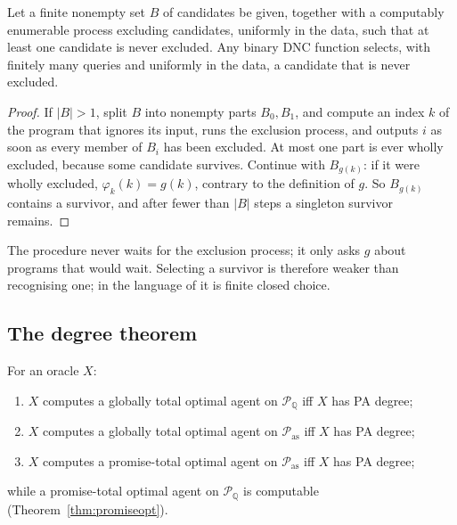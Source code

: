\begin{lemma}\label{lem:finitesel}
Let a finite nonempty set $B$ of candidates be given, together with a computably enumerable process
excluding candidates, uniformly in the data, such that at least one candidate is never excluded. Any
binary DNC function selects, with finitely many queries and uniformly in the data, a candidate that is
never excluded.
\end{lemma}

\begin{proof}
If $|B|>1$, split $B$ into nonempty parts $B_0,B_1$, and compute an index $k$ of the program that
ignores its input, runs the exclusion process, and outputs $i$ as soon as every member of $B_i$ has
been excluded. At most one part is ever wholly excluded, because some candidate survives. Continue
with $B_{g(k)}$: if it were wholly excluded, $\varphi_k(k)=g(k)$, contrary to the definition of $g$. So
$B_{g(k)}$ contains a survivor, and after fewer than $|B|$ steps a singleton survivor remains.
\end{proof}

The procedure never waits for the exclusion process; it only asks $g$ about programs that would wait.
Selecting a survivor is therefore weaker than recognising one; in the language of
\textcite{brattkaetal2012} it is finite closed choice.

\subsection{The degree theorem}

\begin{theorem}\label{thm:pa}
For an oracle $X$:
\begin{enumerate}[label=(\roman*)]
  \item $X$ computes a globally total optimal agent on $\mathcal P_{\mathbb Q}$ iff $X$ has PA degree;
  \item $X$ computes a globally total optimal agent on $\mathcal P_{\mathrm{as}}$ iff $X$ has PA degree;
  \item $X$ computes a promise-total optimal agent on $\mathcal P_{\mathrm{as}}$ iff $X$ has PA degree;
\end{enumerate}
while a promise-total optimal agent on $\mathcal P_{\mathbb Q}$ is computable
(Theorem~\ref{thm:promiseopt}).
\end{theorem}

